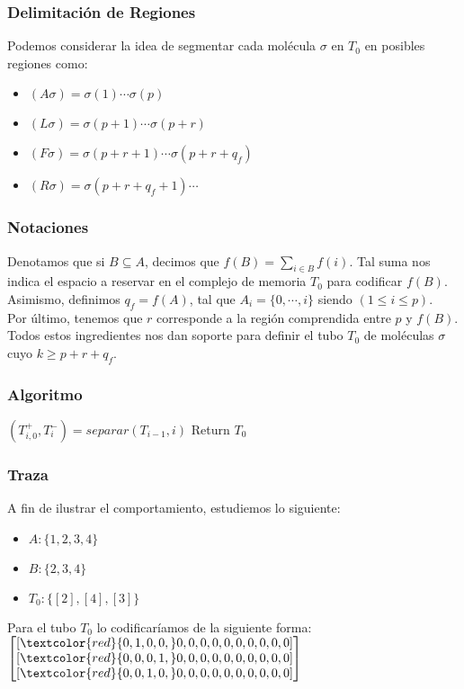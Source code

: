 \documentclass[12pt]{beamer}
\begin{document}
 \begin{frame}
     \frametitle{Delimitación de Regiones}
     Podemos considerar la idea de segmentar cada molécula $\sigma$ en $T_0$ en posibles regiones como:
    \begin{itemize}
        \item $(A\sigma )=\sigma (1)\cdots\sigma (p)$
        \item $(L\sigma )=\sigma (p+1)\cdots\sigma (p+r)$
        \item $(F\sigma)=\sigma(p+r+1)\cdots\sigma(p+r+q_f)$
        \item $(R\sigma)=\sigma(p+r+q_f+1)\cdots$
    \end{itemize}
 \end{frame}
 \begin{frame}
    \frametitle{Notaciones}
    Denotamos que si $B\subseteq A$, decimos que  $f(B)=\sum_{i\in B}f(i)$. Tal suma nos indica el espacio a reservar en el complejo de memoria $T_0$ para codificar $f(B)$. \\
    Asimismo, definimos $q_f=f(A)$, tal que $A_i=\{0,\cdots,i\}$ siendo $(1\leq i\leq p)$. \\
    Por último, tenemos que $r$ corresponde a la región comprendida entre $p$ y $f(B)$.\\
    Todos estos ingredientes nos dan soporte para definir el tubo $T_0$ de moléculas $\sigma$ cuyo $k\geq p+r+q_f$.
 \end{frame}
 \begin{frame}
     \frametitle{Algoritmo}
    \begin{algorithmic}[1]
            \State $(T^+_{i,0}, T^-_i) = separar(T_{i-1}, i)$
            \EndFor
        \EndFor
        \State Return $T_0$
        \EndProcedure
    \end{algorithmic}
 \end{frame}
 \begin{frame}
     \frametitle{Traza}
     A fin de ilustrar el comportamiento, estudiemos lo siguiente:
     \begin{itemize}
        \item $A: \{1, 2, 3, 4\}$
        \item $B: \{2, 3, 4\}$
        \item $T_0: \{[2], [4], [3]\}$
     \end{itemize}
     Para el tubo $T_0$ lo codificaríamos de la siguiente forma:
     $
        \begin{bmatrix}
        [\textcolor{red}{0, 1, 0, 0,} 0, 0, 0, 0, 0, 0, 0, 0, 0, 0] \\
        [\textcolor{red}{0, 0, 0, 1,} 0, 0, 0, 0, 0, 0, 0, 0, 0, 0] \\
        [\textcolor{red}{0, 0, 1, 0,} 0, 0, 0, 0, 0, 0, 0, 0, 0, 0]
        \end{bmatrix}
    $
 \end{frame}
\end{document}
